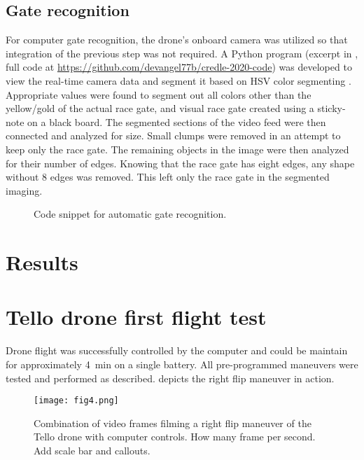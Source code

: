 \documentclass[onecolumn,10pt]{IEEEtran}
\begin{document}
\subsection{Gate recognition}
For computer gate recognition, the drone's onboard camera was utilized so that integration of the previous step was not required. A Python program (excerpt in , full code at \url{https://github.com/devangel77b/credle-2020-code}) was developed to view the real-time camera data and segment it based on HSV color segmenting \cite{bradski2008learning}. Appropriate values were found to segment out all colors other than the yellow/gold of the actual race gate, and visual race gate created using a sticky-note on a black board. The segmented sections of the video feed were then connected and analyzed for size. Small clumps were removed in an attempt to keep only the race gate. The remaining objects in the image were then analyzed for their number of edges. Knowing that the race gate has eight edges, any shape without 8 edges was removed. This left only the race gate in the segmented imaging.
\begin{figure}
\caption{Code snippet for automatic gate recognition.}
\label{fig:pseudocode3}

\end{figure}





   
\clearpage
\section{Results}

\section{Tello drone first flight test}
Drone flight was successfully controlled by the computer and could be maintain for approximately \SI{4}{\minute} on a single battery. All pre-programmed maneuvers were tested and performed as described.  depicts the right flip maneuver in action.
\begin{figure}[ht]
\begin{center}
\texttt{[image: fig4.png]}
\end{center}
\caption{Combination of video frames filming a right flip maneuver of the Tello drone with computer controls. How many frame per second. Add scale bar and callouts.}
\label{fig:4}
\end{figure}
\end{document}
